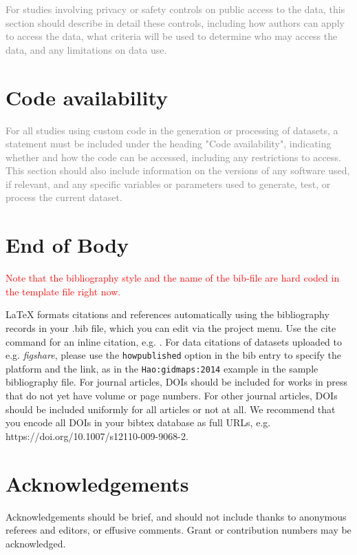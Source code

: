 \documentclass[fleqn,10pt]{wlscirep}
\begin{document}
\textcolor{gray}{For studies involving privacy or safety controls on public access to the data, this section should describe in detail these controls, including how authors can apply to access the data, what criteria will be used to determine who may access the data, and any limitations on data use.}

\section*{Code availability}

\textcolor{gray}{For all studies using custom code in the generation or processing of datasets, a statement must be included under the heading "Code availability", indicating whether and how the code can be accessed, including any restrictions to access. This section should also include information on the versions of any software used, if relevant, and any specific variables or parameters used to generate, test, or process the current dataset.}

\section{End of Body}\label{end-of-body}

\textcolor{red}{Note that the bibliography style and the name of the bib-file are hard coded in the template file right now.}



\noindent LaTeX formats citations and references automatically using the bibliography records in your .bib file, which you can edit via the project menu. Use the cite command for an inline citation, e.g. \cite{Kaufman2020, Figueredo:2009dg, Babichev2002, behringer2014manipulating}. For data citations of datasets uploaded to e.g. \emph{figshare}, please use the \verb|howpublished| option in the bib entry to specify the platform and the link, as in the \verb|Hao:gidmaps:2014| example in the sample bibliography file. For journal articles, DOIs should be included for works in press that do not yet have volume or page numbers. For other journal articles, DOIs should be included uniformly for all articles or not at all. We recommend that you encode all DOIs in your bibtex database as full URLs, e.g. https://doi.org/10.1007/s12110-009-9068-2.

\section*{Acknowledgements} 
Acknowledgements should be brief, and should not include thanks to
anonymous referees and editors, or effusive comments. Grant or
contribution numbers may be acknowledged.
\end{document}
